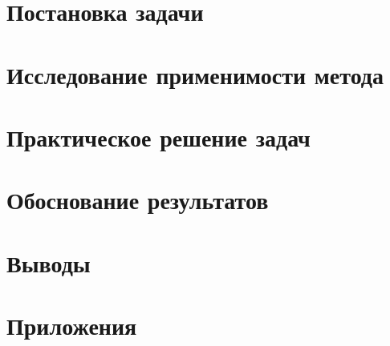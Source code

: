 \documentclass[main.tex]{subfiles}
\begin{document}
\section{Постановка задачи}

\section{Исследование применимости метода}

\section{Практическое решение задач}

\section{Обоснование результатов}

\section{Выводы}

\section{Приложения}

\end{document}
